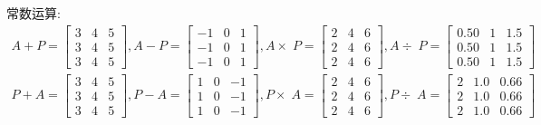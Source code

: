 \documentclass[UTF8,a4paper,notitlepage,openany,plain,final]{ctexbook}
\begin{document}
    常数运算:
    \[ \begin{split}
        A + P =
        \begin{bmatrix}
            3 & 4 & 5 \\
            3 & 4 & 5 \\
            3 & 4 & 5
        \end{bmatrix}
        , A - P =
        \begin{bmatrix}
            -1 & 0 & 1 \\
            -1 & 0 & 1 \\
            -1 & 0 & 1
        \end{bmatrix}
        , A \times\; P =
        \begin{bmatrix}
            2 & 4 & 6 \\
            2 & 4 & 6 \\
            2 & 4 & 6
        \end{bmatrix}
        , A \div\; P =
        \begin{bmatrix}
            0.50 & 1 & 1.5 \\
            0.50 & 1 & 1.5 \\
            0.50 & 1 & 1.5
        \end{bmatrix}
        \\
        P + A =
        \begin{bmatrix}
            3 & 4 & 5 \\
            3 & 4 & 5 \\
            3 & 4 & 5
        \end{bmatrix}
        , P - A =
        \begin{bmatrix}
            1 & 0 & -1 \\
            1 & 0 & -1 \\
            1 & 0 & -1
        \end{bmatrix}
        , P \times\; A =
        \begin{bmatrix}
            2 & 4 & 6 \\
            2 & 4 & 6 \\
            2 & 4 & 6
        \end{bmatrix}
        , P \div\; A =
        \begin{bmatrix}
            2 & 1.0 & 0.66 \\
            2 & 1.0 & 0.66 \\
            2 & 1.0 & 0.66
        \end{bmatrix}
    \end{split} \]
\end{document}
